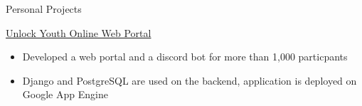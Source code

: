 \documentclass{article}
\newlength{\tabin}
\newlength{\secsep}
\newcommand{\lineunder}{\vspace*{-8pt} \\ \hspace*{-6pt} \hrulefill \\ \vspace*{-15pt}}
\newenvironment{tabbedsection}[1]{
  \begin{list}{}{
      \setlength{\itemsep}{0pt}
      \setlength{\labelsep}{0pt}
      \setlength{\labelwidth}{0pt}
      \setlength{\leftmargin}{\tabin}
      \setlength{\rightmargin}{\tabin}
      \setlength{\listparindent}{0pt}
      \setlength{\parsep}{0pt}
      \setlength{\parskip}{0pt}
      \setlength{\partopsep}{0pt}
      \setlength{\topsep}{#1}
    }
  \item[]
}{\end{list}}
\newenvironment{resume_section}[1]{
  \filbreak
  \vspace{2\secsep}
  \textsc{\large#1}
  \lineunder
  \begin{tabbedsection}{\secsep}
}{\end{tabbedsection}}
\newenvironment{resume_subsection}[2][]{
  \textbf{#2} \hfill {\footnotesize #1} \hspace{2em}
  \begin{tabbedsection}{0.5\secsep}
}{\end{tabbedsection}}
\newenvironment{subitems}{
  \renewcommand{\labelitemi}{-}
  \begin{itemize}
      \setlength{\labelsep}{1em}
}{\end{itemize}}
\begin{document}
\begin{resume_section}{Personal Projects}


  \begin{resume_subsection}{\href{https://github.com/marcustut/UnlockProject}{Unlock Youth Online Web Portal}}
    \begin{subitems}
      \item Developed a web portal and a discord bot for more than 1,000 particpants
      \item Django and PostgreSQL are used on the backend, application is deployed on Google App Engine
    \end{subitems}
  \end{resume_subsection}
\end{resume_section}
\end{document}
